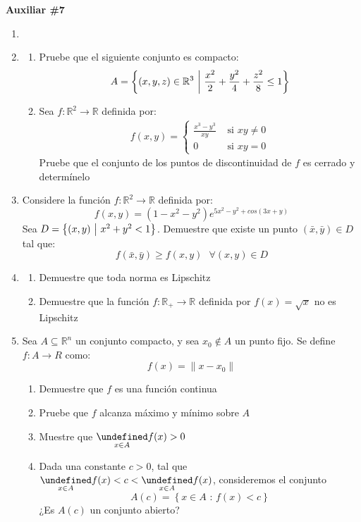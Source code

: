\documentclass[letterpaper,11pt]{article}
\let\max=\undefined\DeclareMathOperator*{\max}{\text{máx}}
\let\min=\undefined\DeclareMathOperator*{\min}{\text{mín}}
\newcommand{\norm}[1]{\lVert #1\rVert }
\begin{document}
\begin{center}
	\LARGE \bf{Auxiliar \#7 }\\
\end{center}

\vspace{-1cm}
\begin{enumerate}\setlength{\itemsep}{0.4cm}	
\item[]

\item
\begin{enumerate}
    \item Pruebe que el siguiente conjunto es compacto:
\[A=\left\{(x,y,z)\in\mathbb{R}^3\text{   }\bigg{|}\text{ } \frac{x^2}{2}+\frac{y^2}{4}+\frac{z^2}{8}\leq 1\right\}\]

\item Sea $f:\mathbb{R}^2\rightarrow\mathbb{R}$ definida por:
\begin{align*}
    \displaystyle
    f(x,y)=\left\{\begin{array}{cl}
    \frac{x^3-y^3}{xy}& \text{ si }xy\neq 0  \\
    0 &\text{ si }xy=0 
    \end{array}\right.
\end{align*}
Pruebe que el conjunto de los puntos de discontinuidad de $f$ es cerrado y determínelo
\end{enumerate}
\item Considere la función $f:\mathbb{R}^2\rightarrow\mathbb{R}$ definida por:
\[f(x,y)=(1-x^2-y^2)e^{5x^2-y^2+cos(3x+y)}\]
Sea $D=\left\{(x,y)\text{  }\big{|}\text{ } x^2+y^2<1\right\}$. Demuestre que existe un punto $(\bar{x},\bar{y})\in D$ tal que:
\[f(\bar{x},\bar{y})\geq f(x,y) \text{   } \forall (x,y)\in D \]
\item 
\begin{enumerate}
    \item Demuestre que toda norma es Lipschitz
    \item Demuestre que la función $f:\mathbb{R}_+\rightarrow\mathbb{R}$ definida por $f(x)=\sqrt{x}$ no es Lipschitz
\end{enumerate}

\item Sea $A\subseteq\mathbb{R}^n$ un conjunto compacto, y sea $x_0\notin A$ un punto fijo. Se define $f: A\rightarrow R$ como:
\[f(x)=\norm{x-x_0}\]
    \begin{enumerate}
        \item Demuestre que $f$ es una función continua
        \item Pruebe que $f$ alcanza máximo y mínimo sobre $A$
        \item Muestre que $\underset{x\in A}{\min}f(x)>0$
        \item Dada una constante $c>0$, tal que $\underset{x\in A}{\min}f(x)<c<\underset{x\in A}{\max}f(x)$, consideremos el conjunto
        \[A(c)=\left\{x\in A \text{ : } f(x)<c\right\}\]
        ¿Es $A(c)$ un conjunto abierto?
    \end{enumerate}
\end{enumerate}
\end{document}
